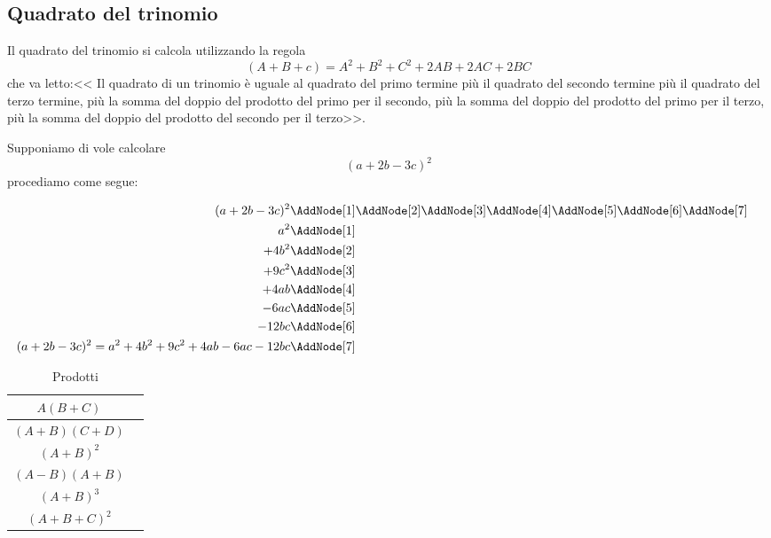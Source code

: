\subsection{Quadrato del trinomio}
Il quadrato del trinomio si calcola utilizzando la regola\[(A+B+c)=A^2+B^2+C^2+2AB+2AC+2BC\] che va letto:<< Il quadrato di un trinomio è uguale al quadrato del primo termine più il quadrato del secondo termine più il quadrato del terzo termine, più la somma del doppio del prodotto del primo per il secondo, più la somma del doppio del prodotto del primo per il terzo, più la somma del doppio del prodotto del secondo per il terzo>>. 
\begin{center}

\end{center}
\begin{esempio}
Supponiamo di vole calcolare \[(a+2b-3c)^2\]
procediamo come segue:
\begin{NodesList}
	\begin{align*}
(a+2b-3c)^2&\AddNode[1]\AddNode[2]\AddNode[3]\AddNode[4]\AddNode[5]\AddNode[6]\AddNode[7]\\
		a^2&\AddNode[1]&\\ 
		+4b^2&\AddNode[2]&\\
		+9c^2&\AddNode[3]\\
		+4ab&\AddNode[4]\\
		-6ac&\AddNode[5]\\
		-12bc&\AddNode[6]\\
		(a+2b-3c)^2=a^2+4b^2+9c^2+4ab-6ac-12bc&\AddNode[7]
	\end{align*}
\end{NodesList}
\end{esempio}
\begin{table}
\centering
\begin{tabular}{cc}
\toprule$A(B+C)$  & \raisebox{-0.4\height}{ } \tabularnewline
\midrule $(A+B)(C+D)$&  \raisebox{-0.4\height}{}\tabularnewline
\midrule $(A+B)^2$& \raisebox{-0.4\height}{}\tabularnewline
\midrule $(A-B)(A+B)$& \raisebox{-0.4\height}{}\tabularnewline
\midrule $(A+B)^3$& \raisebox{-0.4\height}{}\tabularnewline
\midrule $(A+B+C)^2$& \raisebox{-0.4\height}{}\tabularnewline
\bottomrule
\end{tabular} 
\caption{Prodotti}
\label{tab:prodottipolinomi}
\end{table}

